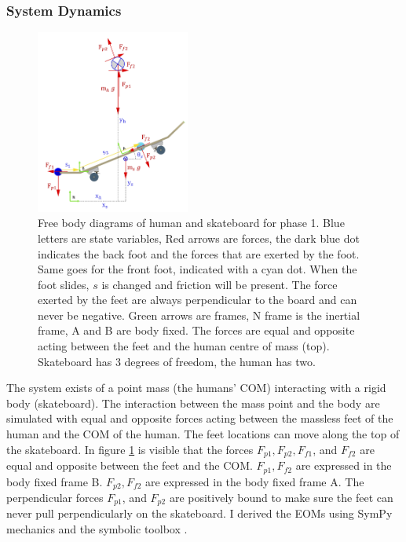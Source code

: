 \subsubsection{System Dynamics}\label{s_systemdynamics}
\begin{figure}
    \centering
    \includegraphics[width=0.45\textwidth]{figure/FBD_skater_feet.png}
    \caption[Free Body Diagrams phase 2 and 3]{Free body diagrams of human and skateboard for phase 1. Blue letters are state variables, Red arrows are forces, the dark blue dot indicates the back foot and the forces that are exerted by the foot. Same goes for the front foot, indicated with a cyan dot. When the foot slides, $s$ is changed and friction will be present. The force exerted by the feet are always perpendicular to the board and can never be negative. Green arrows are frames, N frame is the inertial frame, A and B are body fixed. The forces are equal and opposite acting between the feet and the human centre of mass (top). Skateboard has 3 degrees of freedom, the human has two.}
    \label{f_FBD}
\end{figure}
\noindent The system exists of a point mass (the humans' COM) interacting with a rigid body (skateboard). The interaction between the mass point and the body are simulated with equal and opposite forces acting between the massless feet of the human and the COM of the human. The feet locations can move along the top of the skateboard. In figure \ref{f_FBD} is visible that the forces $F_{p1},F_{p2},F_{f1}$, and $F_{f2}$ are equal and opposite between the feet and the COM. $F_{p1},F_{f2}$ are expressed in the body fixed frame B. $F_{p2},F_{f2}$ are expressed in the body fixed frame A. The perpendicular forces $F_{p1}$, and $F_{p2}$ are positively bound to make sure the feet can never pull perpendicularly on the skateboard. I derived the EOMs using SymPy mechanics and the symbolic toolbox \cite{meurer_sympy_2017}.

